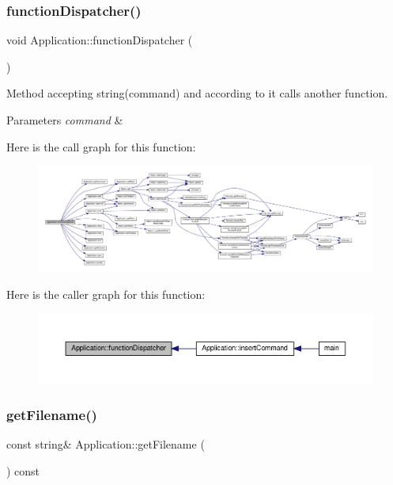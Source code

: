 \subsubsection{\texorpdfstring{function\+Dispatcher()}{functionDispatcher()}}
{\footnotesize\ttfamily void Application\+::function\+Dispatcher (\begin{DoxyParamCaption}{ }\end{DoxyParamCaption})\hspace{0.3cm}{\ttfamily [private]}}

Method accepting string(command) and according to it calls another function. 
\begin{DoxyParams}{Parameters}
{\em command} & \\
\hline
\end{DoxyParams}
Here is the call graph for this function\+:
\nopagebreak
\begin{figure}[H]
\begin{center}
\leavevmode
\includegraphics[width=350pt]{class_application_a00241f0a09c32b0ef3cb1f068475cc50_cgraph}
\end{center}
\end{figure}
Here is the caller graph for this function\+:
\nopagebreak
\begin{figure}[H]
\begin{center}
\leavevmode
\includegraphics[width=350pt]{class_application_a00241f0a09c32b0ef3cb1f068475cc50_icgraph}
\end{center}
\end{figure}
\mbox{\label{class_application_a778575fb76de5352152d8928e1c3410f}} 
\subsubsection{\texorpdfstring{get\+Filename()}{getFilename()}}
{\footnotesize\ttfamily const string\& Application\+::get\+Filename (\begin{DoxyParamCaption}{ }\end{DoxyParamCaption}) const\hspace{0.3cm}{\ttfamily [inline]}}

